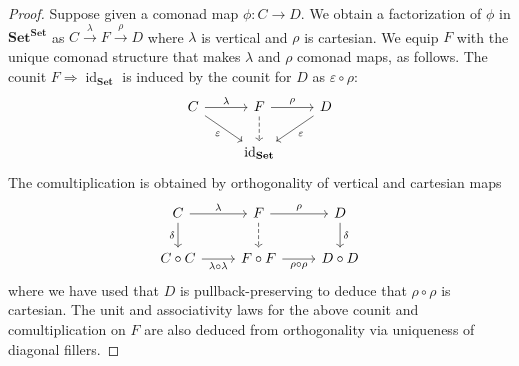 \documentclass[11pt, oneside, article]{memoir}
\theoremstyle{plain}
\theoremstyle{definition}
\theoremstyle{remark}
\DeclareMathOperator{\id}{id}
\newcommand{\dash}{{\mathord{\text{--}}}}
\newcommand{\xto}[1]{\xrightarrow{#1}}
\newcommand{\bang}{\mathrm{!}}
\newcommand{\namedcat}[1]{\mathbf{#1}}
\newcommand{\cat}[1]{\mathbf{#1}}
\newcommand{\Set}{\namedcat{Set}}
\newcommand{\CoalgOn}[2]{{#2}^{#1}}
\newcommand{\CoalgSet}[1]{\CoalgOn{#1}{\Set}}
\newcommand{\CoalgS}[1]{\CoalgOn{#1}{\bS}}
\newcommand{\carr}{\Sigma}
\newcommand{\slicel}{\Sigma_\bang}
\newcommand{\car}[1]{\carr^{#1}}
\newcommand{\carD}{\car{\cD}}
\newcommand{\fun}[2]{{#2}^{#1}}
\newcommand{\End}[1]{\fun{#1}{#1}}
\newcommand{\SetSet}{\End{\Set}}
\newcommand{\cmnd}[1]{{#1}}
\newcommand{\eE}{E}
\newcommand{\cC}{\cmnd{C}}
\newcommand{\cD}{\cmnd{D}}
\newcommand{\bS}{\cat{S}}
\newcommand{\DSet}{\CoalgSet{\cD}}
\newcommand{\DS}{\CoalgS{\cD}}
\newcommand{\idSet}{\id_\Set}
\newcommand{\coto}{\to}
\begin{document}
\begin{proof}
  Suppose given a comonad map $\phi \colon \cC \coto \cD$. We obtain a
  factorization of $\phi$ in $\SetSet$ as $\cC \xto{\lambda} F \xto{\rho} \cD$
  where $\lambda$ is vertical and $\rho$ is cartesian. We equip $F$ with the
  unique comonad structure that makes $\lambda$ and $\rho$ comonad maps, as
  follows. The counit $F \Rightarrow \idSet$ is induced by the counit
  for $\cD$ as $\varepsilon \circ \rho$:
  \[\begin{tikzcd}
      \cC & F & \cD \\
      & \idSet
      \arrow["\lambda", from=1-1, to=1-2]
      \arrow["\varepsilon"', from=1-1, to=2-2]
      \arrow["\rho", from=1-2, to=1-3]
      \arrow[dashed, from=1-2, to=2-2]
      \arrow["\varepsilon", from=1-3, to=2-2]
    \end{tikzcd}\]
  The comultiplication is obtained by
  orthogonality of vertical and cartesian maps
  \[\begin{tikzcd}
      \cC & F & \cD \\
      {\cC \circ \cC} & {F \circ F} & {\cD \circ \cD}
      \arrow["\lambda", from=1-1, to=1-2]
      \arrow["\delta"', from=1-1, to=2-1]
      \arrow["\rho", from=1-2, to=1-3]
      \arrow[dashed, from=1-2, to=2-2]
      \arrow["\delta", from=1-3, to=2-3]
      \arrow["{\lambda \circ \lambda}"', from=2-1, to=2-2]
      \arrow["{\rho \circ \rho}"', from=2-2, to=2-3]
    \end{tikzcd}\] where we have used that $\cD$ is
  pullback-preserving to deduce that $\rho \circ \rho$ is cartesian. The
  unit and associativity laws for the above counit and
  comultiplication on $F$ are also deduced from orthogonality via
  uniqueness of diagonal fillers.
\end{proof}
\end{document}
